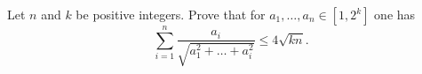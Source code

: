 Let $n$ and $k$ be positive integers. Prove that for $a_1, \dots, a_n \in [1,2^k]$ one has
\[ \sum_{i = 1}^n \frac{a_i}{\sqrt{a_1^2 + \dots + a_i^2}} \le 4 \sqrt{kn}. \]